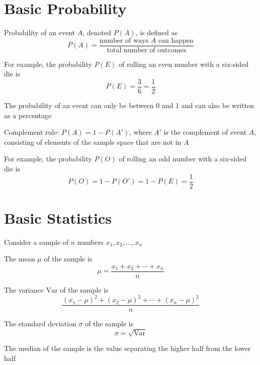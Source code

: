 \documentclass[8pt,a4paper,compress]{beamer}
\begin{document}
\section{Basic Probability}
\begin{frame}[fragile]
\pause\transdissolve

Probability of an event $A$, denoted $P(A)$, is defined as $$P(A) = \frac{\text{number of ways } A \text{ can happen}}{\text{total number of outcomes}}$$

\pause\transdissolve\bigskip

For example, the probability $P(E)$ of rolling an even number with a six-sided die is $$P(E) = \frac{3}{6} = \frac{1}{2}$$

\pause\transdissolve\bigskip

The probability of an event can only be between 0 and 1 and can also be written as a percentage

\pause\transdissolve\bigskip

Complement rule: $P(A) = 1 - P(A')$, where $A'$ is the complement of event $A$, consisting of elements of the sample space that are not in $A$

\pause\transdissolve\bigskip

For example, the probability $P(O)$ of rolling an odd number with a six-sided die is $$P(O) = 1 - P(O') = 1 - P(E) = \frac{1}{2}$$
\end{frame}

\section{Basic Statistics}
\begin{frame}[fragile]
\pause\transdissolve

Consider a sample of $n$ numbers $x_1, x_2, \dots, x_n$

\pause\transdissolve\bigskip

The mean $\mu$ of the sample is $$\mu = \frac{x_1 + x_2 + \cdots + x_n}{n}$$

\pause\transdissolve\bigskip

The variance $\text{Var}$ of the sample is $$\frac{(x_1 - \mu)^2 + (x_2 - \mu)^2 + \cdots + (x_n - \mu)^2}{n}$$

\pause\transdissolve\bigskip

The standard deviation $\sigma$ of the sample is $$\sigma = \sqrt{\text{Var}}$$

\pause\transdissolve\bigskip

The median of the sample is the value separating the higher half from the lower half
\end{frame}
\end{document}

